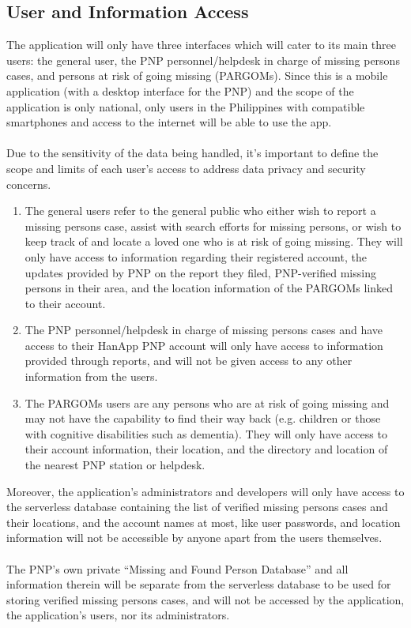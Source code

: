 \subsection{User and Information Access}
The application will only have three interfaces which will cater to its main three users: the general user, the PNP personnel/helpdesk in charge of missing persons cases, and persons at risk of going missing (PARGOMs). Since this is a mobile application (with a desktop interface for the PNP) and the scope of the application is only national, only users in the Philippines with compatible smartphones and access to the internet will be able to use the app.
\\\\Due to the sensitivity of the data being handled, it’s important to define the scope and limits of each user’s access to address data privacy and security concerns.
\begin{enumerate}
    \item The general users refer to the general public who either wish to report a missing persons case, assist with search efforts for missing persons, or wish to keep track of and locate a loved one who is at risk of going missing. They will only have access to information regarding their registered account, the updates provided by PNP on the report they filed, PNP-verified missing persons in their area, and the location information of the PARGOMs linked to their account.
    \item The PNP personnel/helpdesk in charge of missing persons cases and have access to their HanApp PNP account will only have access to information provided through reports, and will not be given access to any other information from the users.
    \item The PARGOMs users are any persons who are at risk of going missing and may not have the capability to find their way back (e.g. children or those with cognitive disabilities such as dementia). They will only have access to their account information, their location, and the directory and location of the nearest PNP station or helpdesk.
\end{enumerate}
Moreover, the application’s administrators and developers will only have access to the serverless database containing the list of verified missing persons cases and their locations, and the account names at most, like user passwords, and location information will not be accessible by anyone apart from the users themselves. 
\\\\The PNP’s own private “Missing and Found Person Database” and all information therein will be separate from the serverless database to be used for storing verified missing persons cases, and will not be accessed by the application, the application’s users, nor its administrators.


